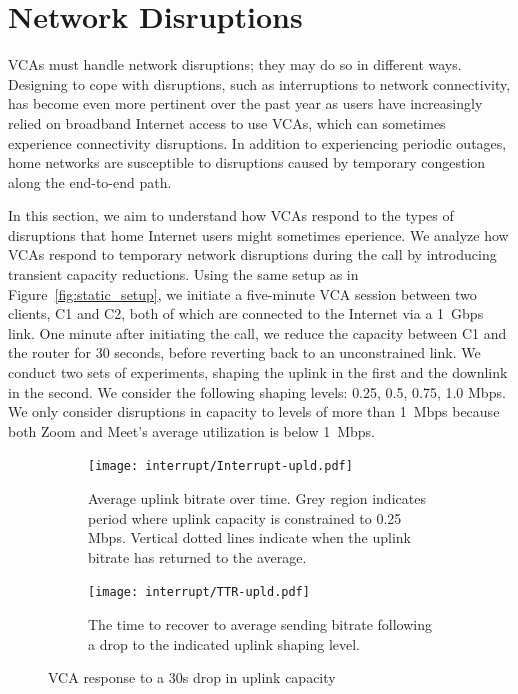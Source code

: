 

\section{Network Disruptions}
\label{sec:interruption}

VCAs must handle network disruptions; they may do so in different ways.
Designing to cope with disruptions, such as interruptions to network
connectivity, has become even more pertinent over the past year as users have
increasingly relied on broadband Internet access to use VCAs, which can
sometimes experience connectivity disruptions.  In addition to experiencing
periodic outages, home networks are susceptible to disruptions caused by
temporary congestion along the end-to-end path.

In this section, we aim to understand how VCAs respond to the types of
disruptions that home Internet users might sometimes eperience. We analyze how
VCAs respond to temporary network disruptions during the call by introducing
transient capacity reductions. Using the same setup as in
Figure~\ref{fig:static_setup}, we initiate a five-minute VCA session between
two clients, C1 and C2, both of which are connected to the Internet via a
1~Gbps link. One minute after initiating the call, we reduce the capacity
between C1 and the router for 30 seconds, before reverting back to an
unconstrained link. We conduct two sets of experiments, shaping the uplink in
the first and the downlink in the second. We consider the following shaping
levels: {0.25, 0.5, 0.75, 1.0} Mbps. We only consider disruptions in capacity
to levels of more than 1~Mbps because both Zoom and Meet's average utilization
is below 1~Mbps.

\begin{figure}[t!]
\centering
\begin{subfigure}[t]{.5\textwidth}
    \centering
    \texttt{[image: interrupt/Interrupt-upld.pdf]}
    \caption{Average uplink bitrate over time. Grey region indicates period where uplink capacity is constrained to 0.25 Mbps. Vertical dotted lines indicate when the uplink bitrate has returned to the average.}
    \label{fig:ts_upld}
\end{subfigure}\hfill
\begin{subfigure}[t]{.5\textwidth}
      \centering
    \texttt{[image: interrupt/TTR-upld.pdf]}
    \caption{The time to recover to average sending bitrate following a drop to the indicated uplink shaping level.}
    \label{fig:TTR_upld}
\end{subfigure}
\caption{VCA response to a 30s drop in uplink capacity}
\label{fig:interrupt-upld}
\end{figure}

